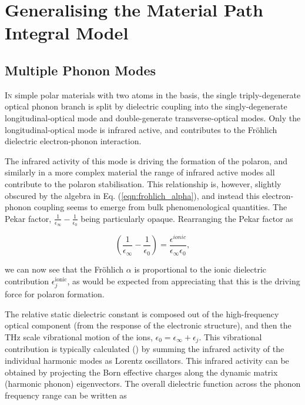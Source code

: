\chapter{Generalising the Material Path Integral Model}
\label{chap:3}



\section{Multiple Phonon Modes}
\label{sec:3-1}

\lettrine{I}n simple polar materials with two atoms in the basis, the single triply-degenerate optical phonon branch is split by dielectric coupling into the singly-degenerate longitudinal-optical mode and double-generate transverse-optical modes. Only the longitudinal-optical mode is infrared active, and contributes to the Fr\"ohlich dielectric electron-phonon interaction. 

The infrared activity of this mode is driving the formation of the polaron, and similarly in a more complex material the range of infrared active modes all contribute to the polaron stabilisation. This relationship is, however, slightly obscured by the algebra in Eq. (\ref{eqn:frohlich_alpha}), and instead this electron-phonon coupling seems to emerge from bulk phenomenological quantities. The Pekar factor, $\frac{1}{\epsilon_{\infty}}-\frac{1}{\epsilon_{0}}$ being particularly opaque. Rearranging the Pekar factor as

\begin{equation}
    \left( \frac{1}{\epsilon_{\infty}} - \frac{1}{\epsilon_{0}} \right) = \frac{\epsilon^{ionic}}{\epsilon_{\infty}\epsilon_{0}},
    \label{eqn:pekar}
\end{equation}

we can now see that the Fr\"ohlich $\alpha$ is proportional to the ionic dielectric contribution $\epsilon^{\text{ionic}}_j$, as would be expected from appreciating that this is the driving force for polaron formation. 

The relative static dielectric constant is composed out of the high-frequency optical component (from the response of the electronic structure), and then the THz scale vibrational motion of the ions, $\epsilon_{0}=\epsilon_{\infty}+\epsilon_{j}$. This vibrational contribution is typically calculated (\cite{gonze_dynamical_1997}) by summing the infrared activity of the individual harmonic modes as Lorentz oscillators. This infrared activity can be obtained by projecting the Born effective charges along the dynamic matrix (harmonic phonon) eigenvectors. The overall dielectric function across the phonon frequency range can be written as 


